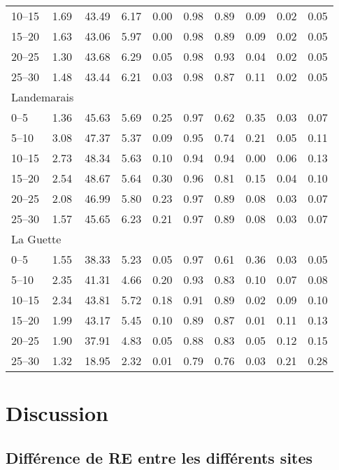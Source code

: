 \begin{table}
\begin{tabular}{llllllllll}
10--15 & 1.69 & 43.49 & 6.17 & 0.00 & 0.98 & 0.89 & 0.09 & 0.02 & 0.05 \\[-1ex] 
15--20 & 1.63 & 43.06 & 5.97 & 0.00 & 0.98 & 0.89 & 0.09 & 0.02 & 0.05 \\[-1ex] 
20--25 & 1.30 & 43.68 & 6.29 & 0.05 & 0.98 & 0.93 & 0.04 & 0.02 & 0.05 \\[-1ex] 
25--30 & 1.48 & 43.44 & 6.21 & 0.03 & 0.98 & 0.87 & 0.11 & 0.02 & 0.05 \\
\multicolumn{2}{l}{Landemarais} & & & & & & & & \\[-1ex] 
0--5 & 1.36 & 45.63 & 5.69 & 0.25 & 0.97 & 0.62 & 0.35 & 0.03 & 0.07 \\[-1ex] 
5--10 & 3.08 & 47.37 & 5.37 & 0.09 & 0.95 & 0.74 & 0.21 & 0.05 & 0.11 \\[-1ex] 
10--15 & 2.73 & 48.34 & 5.63 & 0.10 & 0.94 & 0.94 & 0.00 & 0.06 & 0.13 \\[-1ex] 
15--20 & 2.54 & 48.67 & 5.64 & 0.30 & 0.96 & 0.81 & 0.15 & 0.04 & 0.10 \\[-1ex] 
20--25 & 2.08 & 46.99 & 5.80 & 0.23 & 0.97 & 0.89 & 0.08 & 0.03 & 0.07 \\[-1ex] 
25--30 & 1.57 & 45.65 & 6.23 & 0.21 & 0.97 & 0.89 & 0.08 & 0.03 & 0.07 \\
\multicolumn{2}{l}{La Guette} & & & & & & & & \\[-1ex] 
0--5 & 1.55 & 38.33 & 5.23 & 0.05 & 0.97 & 0.61 & 0.36 & 0.03 & 0.05 \\[-1ex] 
5--10 & 2.35 & 41.31 & 4.66 & 0.20 & 0.93 & 0.83 & 0.10 & 0.07 & 0.08 \\[-1ex] 
10--15 & 2.34 & 43.81 & 5.72 & 0.18 & 0.91 & 0.89 & 0.02 & 0.09 & 0.10 \\[-1ex] 
15--20 & 1.99 & 43.17 & 5.45 & 0.10 & 0.89 & 0.87 & 0.01 & 0.11 & 0.13 \\[-1ex] 
20--25 & 1.90 & 37.91 & 4.83 & 0.05 & 0.88 & 0.83 & 0.05 & 0.12 & 0.15 \\[-1ex] 
25--30 & 1.32 & 18.95 & 2.32 & 0.01 & 0.79 & 0.76 & 0.03 & 0.21 & 0.28 \\
\hline
\end{tabular}
\label{table:phychi}
\end{table}

\section{Discussion}

\subsection{Différence de RE entre les différents sites}

